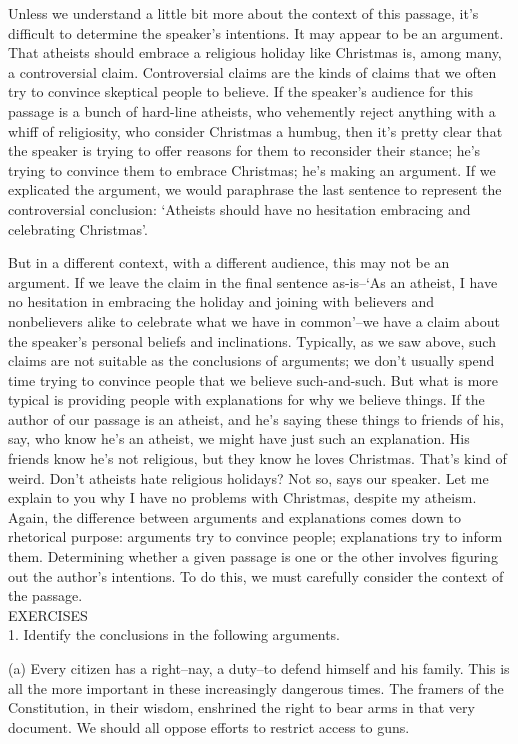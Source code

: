 Unless we understand a little bit more about the context of this passage, it's difficult to determine
the speaker's intentions. It may appear to be an argument. That atheists should embrace a religious
holiday like Christmas is, among many, a controversial claim. Controversial claims are the kinds
of claims that we often try to convince skeptical people to believe. If the speaker's audience for
this passage is a bunch of hard-line atheists, who vehemently reject anything with a whiff of
religiosity, who consider Christmas a humbug, then it's pretty clear that the speaker is trying to
offer reasons for them to reconsider their stance; he's trying to convince them to embrace
Christmas; he's making an argument. If we explicated the argument, we would paraphrase the last
sentence to represent the controversial conclusion: `Atheists should have no hesitation embracing
and celebrating Christmas'.

But in a different context, with a different audience, this may not be an argument. If we leave the
claim in the final sentence as-is--`As an atheist, I have no hesitation in embracing the holiday and
joining with believers and nonbelievers alike to celebrate what we have in common'--we have a
claim about the speaker's personal beliefs and inclinations. Typically, as we saw above, such
claims are not suitable as the conclusions of arguments; we don't usually spend time trying to
convince people that we believe such-and-such. But what is more typical is providing people with
explanations for why we believe things. If the author of our passage is an atheist, and he's saying
these things to friends of his, say, who know he's an atheist, we might have just such an
explanation. His friends know he's not religious, but they know he loves Christmas. That's kind
of weird. Don't atheists hate religious holidays? Not so, says our speaker. Let me explain to you
why I have no problems with Christmas, despite my atheism.
Again, the difference between arguments and explanations comes down to rhetorical purpose:
arguments try to convince people; explanations try to inform them. Determining whether a given
passage is one or the other involves figuring out the author's intentions. To do this, we must
carefully consider the context of the passage. \\

EXERCISES \\

1. Identify the conclusions in the following arguments.

(a) Every citizen has a right--nay, a duty--to defend himself and his family. This is all
the more important in these increasingly dangerous times. The framers of the Constitution,
in their wisdom, enshrined the right to bear arms in that very document. We should all
oppose efforts to restrict access to guns.

